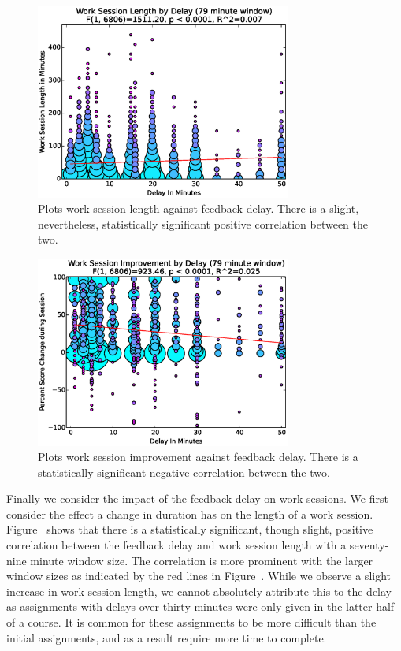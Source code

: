\begin{figure}[!t]
\centering
\includegraphics[width=3.3in]{graphs/Work_Session_Length_by_Delay_(79_minute_window).eps}
\caption{Plots work session length against feedback delay. There is a slight,
  nevertheless, statistically significant positive correlation between the
  two.}
\end{figure}

\begin{figure}[!t]
\centering
\includegraphics[width=3.3in]{graphs/Work_Session_Improvement_by_Delay_(79_minute_window).eps}
\caption{Plots work session improvement against feedback delay. There is a
  statistically significant negative correlation between the two.}
\end{figure}

Finally we consider the impact of the feedback delay on work sessions. We first
consider the effect a change in duration has on the length of a work
session. Figure~ shows that there is a
statistically significant, though slight, positive correlation between the
feedback delay and work session length with a seventy-nine minute window
size. The correlation is more prominent with the larger window sizes as
indicated by the red lines in Figure~. While we
observe a slight increase in work session length, we cannot absolutely
attribute this to the delay as assignments with delays over thirty minutes were
only given in the latter half of a course. It is common for these assignments
to be more difficult than the initial assignments, and as a result require more
time to complete.

